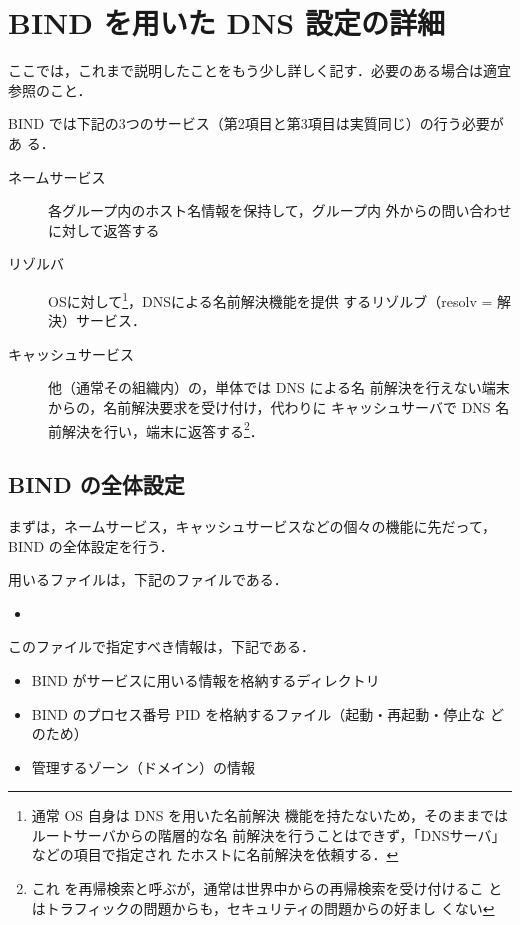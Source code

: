 \clearpage

\section{BIND を用いた DNS 設定の詳細}

ここでは，これまで説明したことをもう少し詳しく記す．必要のある場合は適宜
参照のこと．

BIND では下記の3つのサービス（第2項目と第3項目は実質同じ）の行う必要があ
る．

\begin{description}
 \item[ネームサービス] 各グループ内のホスト名情報を保持して，グループ内
	    外からの問い合わせに対して返答する
 \item[リゾルバ] OSに対して\footnote{通常 OS 自身は DNS を用いた名前解決
	    機能を持たないため，そのままではルートサーバからの階層的な名
	    前解決を行うことはできず，「DNSサーバ」などの項目で指定され
	    たホストに名前解決を依頼する．}，DNSによる名前解決機能を提供
	    するリゾルブ（resolv = 解決）サービス．
 \item[キャッシュサービス] 他（通常その組織内）の，単体では DNS による名
	    前解決を行えない端末からの，名前解決要求を受け付け，代わりに
	    キャッシュサーバで DNS 名前解決を行い，端末に返答する\footnote{これ
	    を再帰検索と呼ぶが，通常は世界中からの再帰検索を受け付けるこ
	    とはトラフィックの問題からも，セキュリティの問題からの好まし
	    くない}．
\end{description}

\subsection{BIND の全体設定}

まずは，ネームサービス，キャッシュサービスなどの個々の機能に先だって，
BIND の全体設定を行う．

用いるファイルは，下記のファイルである．
\begin{itemize}
 \item {}
\end{itemize}

このファイルで指定すべき情報は，下記である．
\begin{itemize}
 \item BIND がサービスに用いる情報を格納するディレクトリ
 \item BIND のプロセス番号 PID を格納するファイル（起動・再起動・停止な
       どのため）
 \item 管理するゾーン（ドメイン）の情報
\end{itemize}

